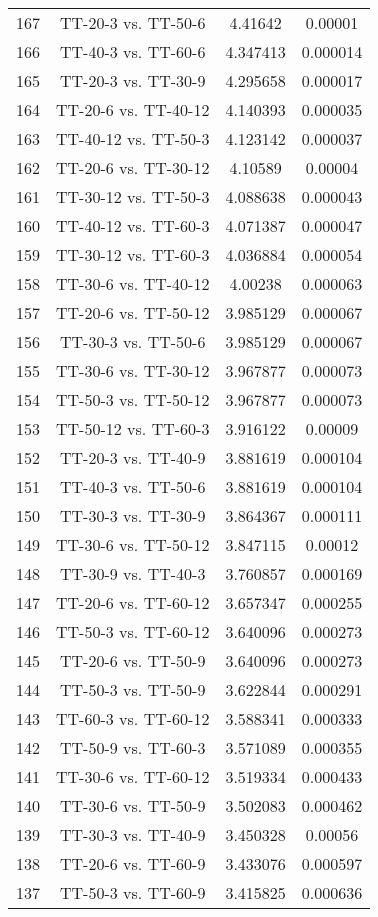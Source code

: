 \documentclass[a4paper,10pt]{article}
\begin{document}
\begin{landscape}
\begin{table}[!htp]
\begin{tabular}{cccc}
167&TT-20-3 vs. TT-50-6&4.41642&0.00001\\
166&TT-40-3 vs. TT-60-6&4.347413&0.000014\\
165&TT-20-3 vs. TT-30-9&4.295658&0.000017\\
164&TT-20-6 vs. TT-40-12&4.140393&0.000035\\
163&TT-40-12 vs. TT-50-3&4.123142&0.000037\\
162&TT-20-6 vs. TT-30-12&4.10589&0.00004\\
161&TT-30-12 vs. TT-50-3&4.088638&0.000043\\
160&TT-40-12 vs. TT-60-3&4.071387&0.000047\\
159&TT-30-12 vs. TT-60-3&4.036884&0.000054\\
158&TT-30-6 vs. TT-40-12&4.00238&0.000063\\
157&TT-20-6 vs. TT-50-12&3.985129&0.000067\\
156&TT-30-3 vs. TT-50-6&3.985129&0.000067\\
155&TT-30-6 vs. TT-30-12&3.967877&0.000073\\
154&TT-50-3 vs. TT-50-12&3.967877&0.000073\\
153&TT-50-12 vs. TT-60-3&3.916122&0.00009\\
152&TT-20-3 vs. TT-40-9&3.881619&0.000104\\
151&TT-40-3 vs. TT-50-6&3.881619&0.000104\\
150&TT-30-3 vs. TT-30-9&3.864367&0.000111\\
149&TT-30-6 vs. TT-50-12&3.847115&0.00012\\
148&TT-30-9 vs. TT-40-3&3.760857&0.000169\\
147&TT-20-6 vs. TT-60-12&3.657347&0.000255\\
146&TT-50-3 vs. TT-60-12&3.640096&0.000273\\
145&TT-20-6 vs. TT-50-9&3.640096&0.000273\\
144&TT-50-3 vs. TT-50-9&3.622844&0.000291\\
143&TT-60-3 vs. TT-60-12&3.588341&0.000333\\
142&TT-50-9 vs. TT-60-3&3.571089&0.000355\\
141&TT-30-6 vs. TT-60-12&3.519334&0.000433\\
140&TT-30-6 vs. TT-50-9&3.502083&0.000462\\
139&TT-30-3 vs. TT-40-9&3.450328&0.00056\\
138&TT-20-6 vs. TT-60-9&3.433076&0.000597\\
137&TT-50-3 vs. TT-60-9&3.415825&0.000636\\

\end{tabular}
\end{table}
\end{landscape}
\end{document}
